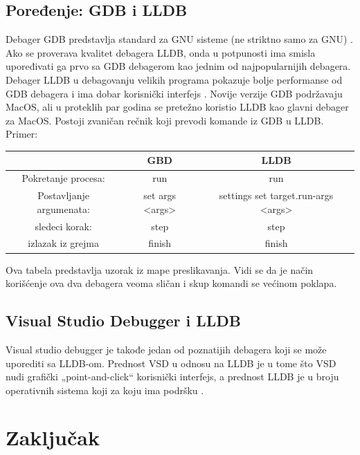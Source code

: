 \documentclass[a4paper]{article}
\begin{document}
\subsection{Poređenje: GDB i LLDB}
\label{subsec: GDB i LLDB}

Debager GDB predstavlja standard za GNU sisteme (ne striktno samo za GNU) \cite{gdb}. Ako se proverava kvalitet debagera LLDB, onda u potpunosti ima smisla upoređivati ga prvo sa GDB debagerom kao jednim od najpopularnijih debagera. Debager LLDB u debagovanju velikih programa pokazuje bolje performanse od GDB debagera i ima dobar korisnički interfejs \cite{lldb_project_blog}. Novije verzije GDB podržavaju MacOS, ali u proteklih par godina se pretežno koristio LLDB kao glavni debager za MacOS. Postoji zvaničan rečnik koji prevodi komande iz GDB u LLDB. \cite {lldb_to_gdb_map} Primer:

\begin{center}
	\begin{tabular}{c | c | c}
		& GBD & LLDB \\ 
		\hline
		Pokretanje procesa: & run & run \\ 
		\hline 
		Postavljanje argumenata: &set args <args>
		& settings set target.run-args <args> \\
		\hline
		sledeci korak: & step & step \\
		\hline
		izlazak iz grejma & finish & finish
	\end{tabular}
\end{center}

\indent Ova tabela predstavlja uzorak iz mape preslikavanja. Vidi se da je način korišćenje ova dva debagera veoma sličan i skup komandi se većinom poklapa. 

\subsection{Visual Studio Debugger i LLDB}
\label{subsec: Visual Studio Debugger i LLDB}


Visual studio debugger je takođe jedan od poznatijih debagera koji se može uporediti sa LLDB-om. Prednost VSD u odnosu na LLDB je u tome što VSD nudi grafički „point-and-click“ korisnički interfejs, a prednost LLDB je u broju operativnih sistema koji za koju ima podršku \cite{vsd}.
\section{Zaključak}
\label{sec:zakljucak}
\end{document}
